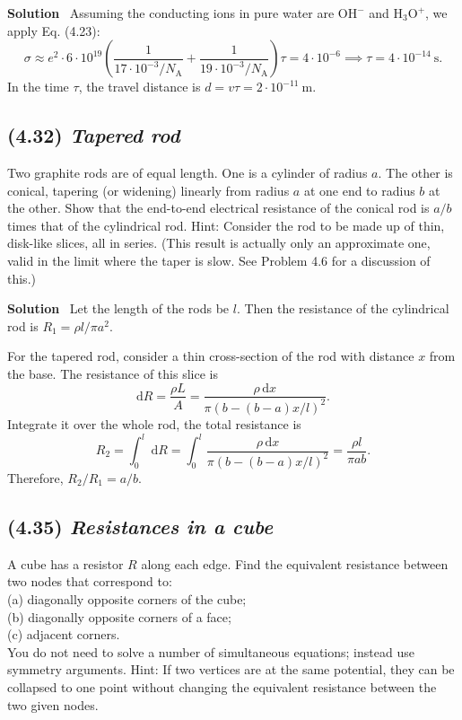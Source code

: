 \documentclass[hidelinks]{article}
\begin{document}
\vspace{5mm}
\noindent
\textbf{Solution} \, Assuming the conducting ions in pure water are $\text{OH}^-$ and $\text{H}_3\text{O}^+$, we apply Eq. (4.23):
$$\sigma \approx e^2 \cdot 6 \cdot 10^{19} \left( \frac{1}{17\cdot 10^{-3} / N_\mathrm{A}} + \frac{1}{19\cdot 10^{-3} / N_{\mathrm{A}}}\right) \tau = 4 \cdot 10^{-6} \implies \tau = 4 \cdot 10^{-14} \ \text{s}.$$
In the time $\tau$, the travel distance is $d=v\tau = 2\cdot 10^{-11} \ \text{m}$.

\subsection{(4.32) \textit{Tapered rod}}
Two graphite rods are of equal length. One is a cylinder of radius $a$. The other is conical, tapering (or widening) linearly from radius $a$ at one end to radius $b$ at the other. Show that the end-to-end electrical resistance of the conical rod is $a/b$ times that of the cylindrical rod. Hint: Consider the rod to be made up of thin, disk-like slices, all in series. (This result is actually only an approximate one, valid in the limit where the taper is slow. See Problem 4.6 for a discussion of this.)

\vspace{5mm}
\noindent
\textbf{Solution} \, Let the length of the rods be $l$. Then the resistance of the cylindrical rod is $R_1 = \rho l/\pi a^2$. 

For the tapered rod, consider a thin cross-section of the rod with distance $x$ from the base. The resistance of this slice is
$$\mathrm{d}R = \frac{\rho L}{A} = \frac{\rho \, \mathrm{d}x}{\pi (b-(b-a)x/l)^2}.$$
Integrate it over the whole rod, the total resistance is 
$$R_2 = \int _0^l \, \mathrm{d}R = \int_0^l \frac{\rho \, \mathrm{d}x}{\pi (b-(b-a)x/l)^2} =  \frac{\rho l}{\pi ab}.$$
Therefore, $R_2/R_1=a/b$.

\subsection{(4.35) \textit{Resistances in a cube}}
A cube has a resistor $R$ along each edge. Find the equivalent resistance between two nodes that correspond to:\\[3mm]
(a) diagonally opposite corners of the cube;\\
(b) diagonally opposite corners of a face;\\
(c) adjacent corners.\\[3mm]
You do not need to solve a number of simultaneous equations; instead use symmetry arguments. Hint: If two vertices are at the same potential, they can be collapsed to one point without changing the equivalent resistance between the two given nodes.
\end{document}
